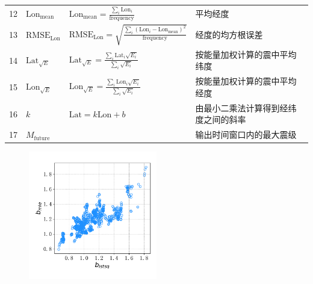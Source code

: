 \begin{table}
\begin{tabular}{llll}
    12 & $\text{Lon}_{\text{mean}}$ & $\displaystyle \text{Lon}_{\text{mean}}=\frac{\sum_i{\text{Lon}_i}}{\text{frequency}}$ & 平均经度\\ 
    13 & $\text{RMSE}_{\text{Lon}}$ & $\displaystyle \text{RMSE}_{\text{Lon}}=\sqrt{\frac{\sum_i{(\text{Lon}_i-\text{Lon}_\text{mean})}^2}{\text{frequency}}}$ &  经度的均方根误差 \\ 
    14 & $\text{Lat}_{\sqrt{E}}$ & $\displaystyle \text{Lat}_{\sqrt{E}}=\frac{\sum_i{\text{Lat}_i\sqrt{E_i}}}{\sum_i{\sqrt{E_i}}}$ & 按能量加权计算的震中平均纬度 \\ 
    15 & $\text{Lon}_{\sqrt{E}}$ & $\displaystyle \text{Lon}_{\sqrt{E}}=\frac{\sum_i{\text{Lon}_i\sqrt{E_i}}}{\sum_i{\sqrt{E_i}}}$ & 按能量加权计算的震中平均经度 \\ 
    16 & $k$ & $\text{Lat}=k\text{Lon}+b$ & 由最小二乘法计算得到经纬度之间的斜率 \\
    17 & $M_{\text{future}}$ & & 输出时间窗口内的最大震级 \\
    \bottomrule
  \end{tabular} 
\end{table}

\begin{figure}[!htbp]
  \centering
  \includegraphics[width=0.50\textwidth]{Img/chap5_seism/seism_b_lstsq_mle_1932_2021.pdf}
  \vspace{-0.5cm}
  \label{fig:seism_b_lstsq_mle_1932_2021}
\end{figure}

